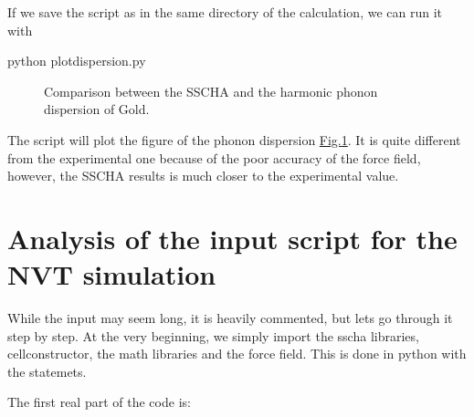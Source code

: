 \documentclass[a4paper,11pt,english]{sphinxmanual}
\let\sphinxpxdimen\pdfpxdimen\else\newdimen\sphinxpxdimen
\begin{document}
\sphinxAtStartPar
If we save the script as  in the same directory of the calculation, we can run it with

\begin{sphinxVerbatim}[commandchars=\\\{\}]
\PYGZdl{} python plot\PYGZus{}dispersion.py
\end{sphinxVerbatim}

\begin{figure}[htbp]
\centering
\capstart

\noindent\sphinxincludegraphics[width=450\sphinxpxdimen]{{gold_dispersion}.png}
\caption{Comparison between the SSCHA and the harmonic phonon dispersion of Gold.}\label{\detokenize{start:id3}}\label{\detokenize{start:fig-dispersion}}\end{figure}

\sphinxAtStartPar
The script will plot the figure of the phonon dispersion \hyperref[\detokenize{start:fig-dispersion}]{Fig.\@ \ref{\detokenize{start:fig-dispersion}}}.
It is quite different from the experimental one because of the poor accuracy of the force field, however, the SSCHA results is much closer to the experimental value.


\section{Analysis of the input script for the NVT simulation}
\label{\detokenize{start:analysis-of-the-input-script-for-the-nvt-simulation}}
\sphinxAtStartPar
While the input may seem long, it is heavily commented, but lets go through it step by step.
At the very beginning, we simply import the sscha libraries, cellconstructor, the math libraries and the force field. This is done in python with the  statemets.

\sphinxAtStartPar
The first real part of the code is:

\begin{sphinxVerbatim}[commandchars=\\\{\}]
  

  

   
  
\end{sphinxVerbatim}
\end{document}
